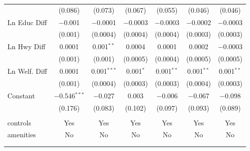 \begin{table}[!htbp]
\begin{tabular}{@{\extracolsep{5pt}}lcccccc}
  & (0.086) & (0.073) & (0.067) & (0.055) & (0.046) & (0.046) \\ 
  Ln Educ Diff & $-$0.001 & $-$0.0001 & $-$0.0003 & $-$0.0003 & $-$0.0002 & $-$0.0003 \\ 
  & (0.001) & (0.0004) & (0.0004) & (0.0004) & (0.0003) & (0.0003) \\ 
  Ln Hwy Diff & 0.0001 & 0.001$^{**}$ & 0.0004 & 0.0001 & 0.0002 & $-$0.0003 \\ 
  & (0.001) & (0.001) & (0.0005) & (0.0004) & (0.0005) & (0.0005) \\ 
  Ln Welf. Diff & 0.0001 & 0.001$^{***}$ & 0.001$^{*}$ & 0.001$^{**}$ & 0.001$^{**}$ & 0.001$^{**}$ \\ 
  & (0.001) & (0.0004) & (0.0003) & (0.0003) & (0.0004) & (0.0003) \\ 
  Constant & $-$0.546$^{***}$ & $-$0.027 & 0.003 & $-$0.006 & $-$0.067 & $-$0.098 \\ 
  & (0.176) & (0.083) & (0.102) & (0.097) & (0.093) & (0.089) \\ 
 \hline \\[-1.8ex] 
controls & Yes & Yes & Yes & Yes & Yes & Yes \\ 
amenities & No & No & No & No & No & No \\ 
\hline \\[-1.8ex] 
\hline 
\hline \\[-1.8ex] 
\end{tabular} 
\end{table} 
